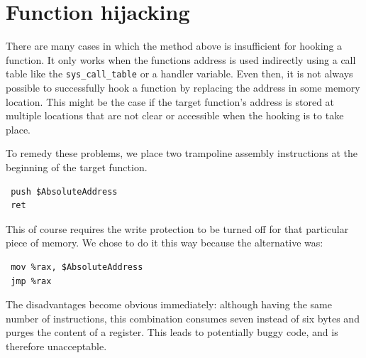 \section{Function hijacking}\label{hijack}
There are many cases in which the method above is insufficient for hooking a 
function. It only works when the functions address is used indirectly using a 
call table like the \verb+sys_call_table+ or a handler variable. Even then, it 
is not always possible to successfully hook a function by replacing the address 
in some memory location. This might be the case if the target function's 
address is stored at multiple locations that are not clear or accessible when 
the hooking is to take place.\par
To remedy these problems, we place two trampoline assembly instructions at the 
beginning of the target function.
\lstset{style=customasm}
\begin{lstlisting}
 push $AbsoluteAddress
 ret
\end{lstlisting}
This of course requires the write protection to be turned off for that 
particular piece of memory. We chose to do it this way because the alternative 
was:
\begin{lstlisting}
 mov %rax, $AbsoluteAddress
 jmp %rax
\end{lstlisting}
The disadvantages become obvious immediately: although having the same number 
of instructions, this combination consumes seven instead of six bytes and 
purges the content of a register. This leads to potentially 
buggy code, and is therefore unacceptable.\newline

